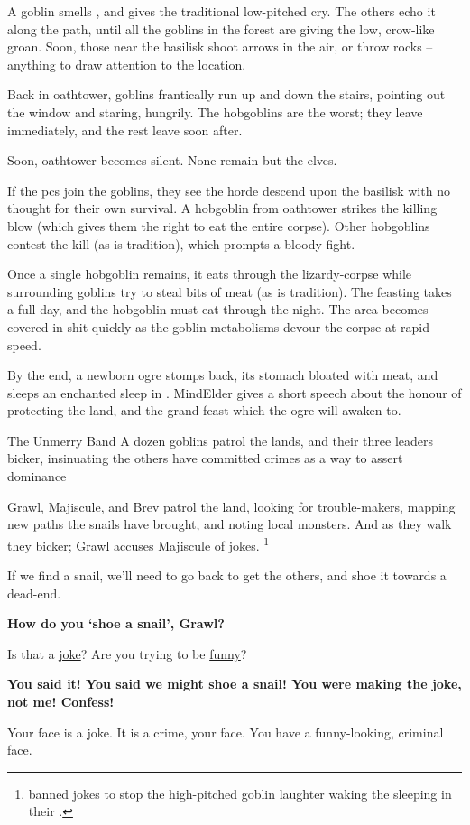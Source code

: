 A goblin smells , and gives the traditional low-pitched cry.
The others echo it along the path, until all the goblins in the forest are giving the low, crow-like groan.
Soon, those near the \gls{basilisk} shoot arrows in the air, or throw rocks -- anything to draw attention to the location.

Back in \gls{oathtower}, goblins frantically run up and down the stairs, pointing out the window and staring, hungrily.
The hobgoblins are the worst; they leave immediately, and the rest leave soon after.

Soon, \gls{oathtower} becomes silent.
None remain but the elves.

If the \glspl{pc} join the goblins, they see the horde descend upon the \gls{basilisk} with no thought for their own survival.
A hobgoblin from \gls{oathtower} strikes the killing blow (which gives them the right to eat the entire corpse).
Other hobgoblins contest the kill (as is tradition), which prompts a bloody fight.

Once a single hobgoblin remains, it eats through the lizardy-corpse while surrounding goblins try to steal bits of meat (as is tradition).
The feasting takes a full day, and the hobgoblin must eat through the night.
The area becomes covered in shit quickly as the goblin metabolisms devour the corpse at rapid speed.

By the end, a newborn \gls{ogre} stomps back, its stomach bloated with meat, and sleeps an enchanted sleep in .
\Gls{MindElder} gives a short speech about the honour of protecting the land, and the grand feast which the \gls{ogre} will awaken to.

{The Unmerry Band}%
{A dozen goblins patrol the lands, and their three leaders bicker, insinuating the others have committed crimes as a way to assert dominance}%

Grawl, Majiscule, and Brev patrol the land, looking for trouble-makers, mapping new paths the snails have brought, and noting local monsters.
And as they walk they bicker; Grawl accuses Majiscule of jokes.%
\footnote{ banned jokes to stop the high-pitched goblin laughter waking the  sleeping in their .}

\begin{speechtext}
  If we find a snail, we'll need to go back to get the others, and shoe it towards a dead-end.

  \textbf{How do you `shoe a snail', Grawl?}

  Is that a \underline{joke}?
  Are you trying to be \underline{funny}?

  \textbf{You said it!
  You said we might shoe a snail!
  You were making the joke, not me!
  Confess!}

  Your face is a joke.
  It is a crime, your face.
  You have a funny-looking, criminal face.
\end{speechtext}

